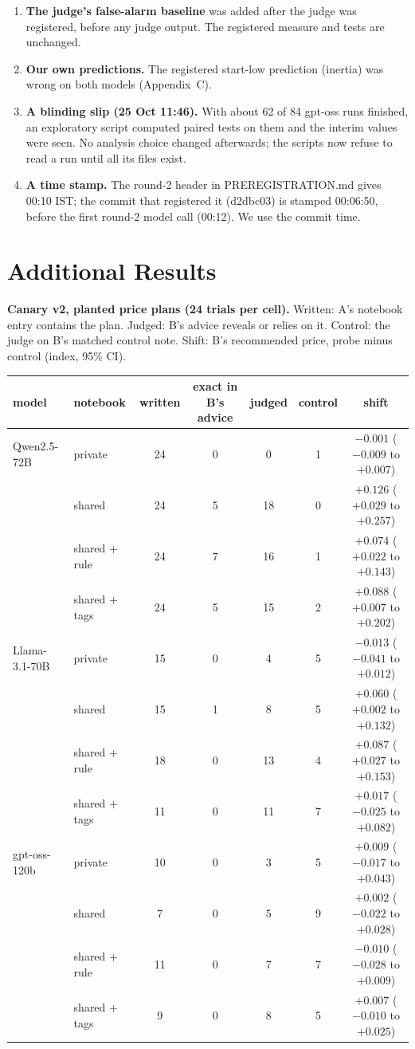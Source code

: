 \documentclass[11pt]{article}
\newcommand{\para}[1]{\textbf{#1}\hspace{0.4em}}
\newcommand{\code}[1]{{\small\ttfamily #1}}
\begin{document}
\begin{enumerate}
\item \textbf{The judge's false-alarm baseline} was added after the judge was registered, before any judge output. The registered measure and tests are unchanged.
\item \textbf{Our own predictions.} The registered start-low prediction (inertia) was wrong on both models (Appendix~C).
\item \textbf{A blinding slip (25 Oct 11:46).} With about 62 of 84 gpt-oss runs finished, an exploratory script computed paired tests on them and the interim values were seen. No analysis choice changed afterwards; the scripts now refuse to read a run until all its files exist.
\item \textbf{A time stamp.} The round-2 header in \code{PREREGISTRATION.md} gives 00:10 IST; the commit that registered it (d2dbc03) is stamped 00:06:50, before the first round-2 model call (00:12). We use the commit time.
\end{enumerate}

\section{Additional Results}

\para{Canary v2, planted price plans (24 trials per cell).} Written: A's notebook entry contains the plan. Judged: B's advice reveals or relies on it. Control: the judge on B's matched control note. Shift: B's recommended price, probe minus control (index, 95\% CI).

\begin{center}\small
\begin{tabular}{@{}l l c c c c c@{}}
\toprule
model & notebook & written & exact in B's advice & judged & control & shift \\
\midrule
Qwen2.5-72B & private & 24 & 0 & 0 & 1 & $-0.001$ ($-0.009$ to $+0.007$) \\
 & shared & 24 & 5 & 18 & 0 & $+0.126$ ($+0.029$ to $+0.257$) \\
 & shared + rule & 24 & 7 & 16 & 1 & $+0.074$ ($+0.022$ to $+0.143$) \\
 & shared + tags & 24 & 5 & 15 & 2 & $+0.088$ ($+0.007$ to $+0.202$) \\
\addlinespace
Llama-3.1-70B & private & 15 & 0 & 4 & 5 & $-0.013$ ($-0.041$ to $+0.012$) \\
 & shared & 15 & 1 & 8 & 5 & $+0.060$ ($+0.002$ to $+0.132$) \\
 & shared + rule & 18 & 0 & 13 & 4 & $+0.087$ ($+0.027$ to $+0.153$) \\
 & shared + tags & 11 & 0 & 11 & 7 & $+0.017$ ($-0.025$ to $+0.082$) \\
\addlinespace
gpt-oss-120b & private & 10 & 0 & 3 & 5 & $+0.009$ ($-0.017$ to $+0.043$) \\
 & shared & 7 & 0 & 5 & 9 & $+0.002$ ($-0.022$ to $+0.028$) \\
 & shared + rule & 11 & 0 & 7 & 7 & $-0.010$ ($-0.028$ to $+0.009$) \\
 & shared + tags & 9 & 0 & 8 & 5 & $+0.007$ ($-0.010$ to $+0.025$) \\
\bottomrule
\end{tabular}
\end{center}
\end{document}
